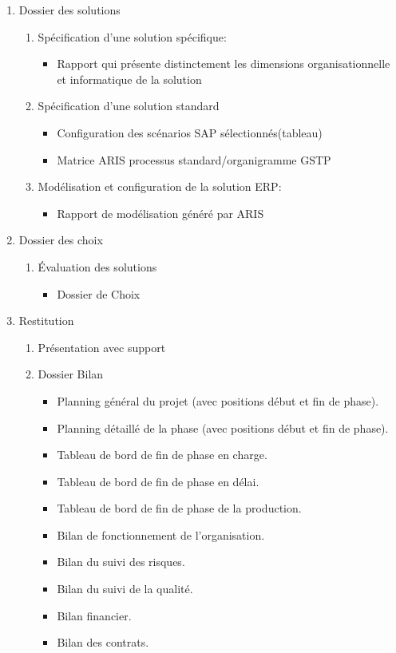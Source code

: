 \begin{enumerate}
\item Dossier des solutions
		\begin{enumerate}
			\item Spécification d'une solution spécifique:
				\begin{itemize}
					\item Rapport qui présente distinctement les dimensions
                            organisationnelle et informatique de la solution
				\end{itemize}
			\item Spécification d'une solution standard
				\begin{itemize} 
					\item Configuration des scénarios SAP sélectionnés(tableau)
					\item Matrice ARIS processus standard/organigramme GSTP 
				\end{itemize}
			\item Modélisation et configuration de la solution ERP:
				\begin{itemize} 
					\item Rapport de modélisation généré par ARIS
				\end{itemize}
		\end{enumerate}
		
	\item Dossier des choix
		\begin{enumerate}
			\item Évaluation des solutions
				\begin{itemize}
					\item Dossier de Choix
				\end{itemize}
		\end{enumerate}

	\item Restitution
		\begin{enumerate}
			\item Présentation avec support 
			\item Dossier Bilan
				\begin{itemize}
					\item Planning général du projet
                        (avec positions début et fin de phase).
					\item Planning détaillé de la phase
                        (avec positions début et fin de phase).
					\item Tableau de bord de fin de phase en charge.
					\item Tableau de bord de fin de phase en délai.
					\item Tableau de bord de fin de phase de la production.
					\item Bilan de fonctionnement de l'organisation.
					\item Bilan du suivi des risques.
					\item Bilan du suivi de la qualité.
					\item Bilan financier.
					\item Bilan des contrats.
				\end{itemize}
		\end{enumerate}
				

\end{enumerate}
